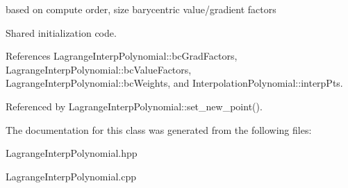 based on compute order, size barycentric value/gradient factors 

Shared initialization code. 

References Lagrange\+Interp\+Polynomial\+::bc\+Grad\+Factors, Lagrange\+Interp\+Polynomial\+::bc\+Value\+Factors, Lagrange\+Interp\+Polynomial\+::bc\+Weights, and Interpolation\+Polynomial\+::interp\+Pts.



Referenced by Lagrange\+Interp\+Polynomial\+::set\+\_\+new\+\_\+point().



The documentation for this class was generated from the following files\+:\begin{DoxyCompactItemize}
\item 
Lagrange\+Interp\+Polynomial.\+hpp\item 
Lagrange\+Interp\+Polynomial.\+cpp\end{DoxyCompactItemize}
